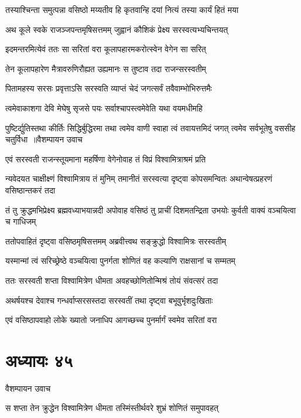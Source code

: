 \twolineshloka
{तस्याश्चिन्ता समुत्पन्ना वसिष्ठो मय्यतीव हि}
{कृतवान्हि दयां नित्यं तस्या कार्यं हितं मया}


\twolineshloka
{अथ कूले स्वके राजञ्जपन्तमृषिसत्तमम्}
{जुह्वानं कौशिकं प्रेक्ष्य सरस्वत्यभ्यचिन्तयत्}


\twolineshloka
{इदमन्तरमित्येवं ततः सा सरितां वरा}
{कूलापहारमकरोत्स्वेन वेगेन सा सरित्}


\twolineshloka
{तेन कूलापहारेण मैत्रावरुणिरौह्यत}
{उह्यमानः स तुष्टाव तदा राजन्सरस्वतीम्}


\twolineshloka
{पितामहस्य सरसः प्रवृत्ताऽसि सरस्वति}
{व्याप्तं चेदं जगत्सर्वं तवैवाम्भोभिरुत्तमैः}


\twolineshloka
{त्वमेवाकाशगा देवि मेघेषु सृजसे पयः}
{सर्वाश्चापस्त्वमेवेति यथा वयमधीमहि}


\fourlineindentedshloka
{पुष्टिर्द्युतिस्तथा कीर्तिः सिद्धिर्बुद्धिरमा तथा}
{त्वमेव वाणी स्वाहा त्वं तवायत्तमिदं जगत्}
{त्वमेव सर्वभूतेषु वससीह चतुर्विधा ॥वैशम्पायन उवाच}
{}


\twolineshloka
{एवं सरस्वती राजन्स्तूयमाना महर्षिणा}
{वेगेनोवाह तं विप्रं विश्वामित्राश्रमं प्रति}


न्यवेदयत चाक्षीक्ष्णं विश्वामित्राय तं मुनिम्
\twolineshloka
{तमानीतं सरस्वत्या दृष्ट्वा कोपसमन्वितः}
{अथान्वेषत्प्रहरणं वसिष्ठान्तकरं तदा}


\threelineshloka
{तं तु क्रुद्धमभिप्रेक्ष्य ब्रह्मवध्याभयान्नदी}
{अपोवाह वसिष्ठं तु प्राचीं दिशमतन्द्रिता}
{उभयोः कुर्वती वाक्यं वञ्चयित्वा च गाधिजम्}


\twolineshloka
{ततोपवाहितं दृष्ट्वा वसिष्ठमृषिसत्तमम्}
{अब्रवीत्त्वथ सङ्क्रुद्धो विश्वामित्रः सरस्वतीम्}


\twolineshloka
{यस्मान्मां त्वं सरिच्छ्रेष्ठे वञ्चयित्वा पुनर्गता}
{शोणितं वह कल्याणि राक्षसानां च सम्मतम्}


\twolineshloka
{ततः सरस्वती शप्ता विश्वामित्रेण धीमता}
{अवहच्छोणितोन्मिश्रं तोयं संवत्सरं तदा}


\twolineshloka
{अथर्षयश्च देवाश्च गन्धर्वाप्सरसस्तदा}
{सरस्वतीं तथा दृष्ट्वा बभूवुर्भृशदुःखिताः}


\twolineshloka
{एवं वसिष्ठापवाहो लोके ख्यातो जनाधिप}
{आगच्छच्च पुनर्मार्गं स्वमेव सरितां वरा}


\chapter{अध्यायः ४५}
\twolineshloka
{वैशम्पायन उवाच}
{}


\twolineshloka
{स शप्ता तेन क्रुद्धेन विश्वामित्रेण धीमता}
{तस्मिंस्तीर्थवरे शुभ्रं शोणितं समुपावहत्}


